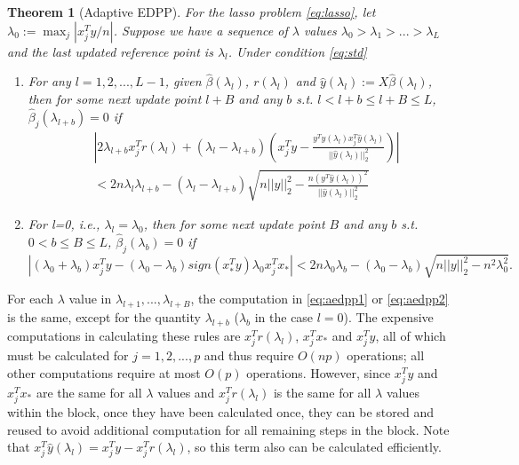 \documentclass[]{interact}
\theoremstyle{plain}%
\newtheorem{theorem}{Theorem}[section]
\theoremstyle{definition}
\theoremstyle{remark}
\begin{document}
\begin{theorem}[Adaptive EDPP]
    For the lasso problem \eqref{eq:lasso}, let $\lambda_0:=\max_j|x_j^Ty/n|$. Suppose we have a sequence of $\lambda$ values $\lambda_0>\lambda_1>...>\lambda_L$ and the last updated reference point is $\lambda_l$. Under condition \eqref{eq:std}
    \begin{enumerate}
        \item For any $l=1,2,...,L-1$, given $\hat{\beta}(\lambda_l)$, $r(\lambda_l)$ and $\hat{y}(\lambda_l):=X\hat{\beta}(\lambda_l)$, then for some next update point $l+B$ and any $b$ s.t. $l<l+b\leq l+B\leq L$, $\hat{\beta}_j(\lambda_{l+b})=0$ if
        \begin{equation}
            \label{eq:aedpp1}
            \begin{split}
                &\left|2\lambda_{l+b}x_j^Tr(\lambda_l)+(\lambda_l-\lambda_{l+b})\left( x_j^Ty-\frac{y^T\hat{y}(\lambda_l)x_j^T\hat{y}(\lambda_l)}{||\hat{y}(\lambda_l)||_2^2}\right)\right|\\&<2n\lambda_l\lambda_{l+b}-(\lambda_l-\lambda_{l+b})\sqrt{n||y||_2^2-\frac{n(y^T\hat{y}(\lambda_l))^2}{||\hat{y}(\lambda_l)||_2^2}}
            \end{split}
        \end{equation}
        \item For l=0, i.e., $\lambda_l=\lambda_0$, then for some next update point $B$ and any $b$ s.t. $0<b\leq B\leq L$, $\hat{\beta}_j(\lambda_{b})=0$ if
        \begin{equation}
            \label{eq:aedpp2}
            |(\lambda_0+\lambda_b)x_j^Ty-(\lambda_0-\lambda_b)sign(x_*^Ty)\lambda_0x_j^Tx_*|<2n\lambda_0\lambda_b-(\lambda_0-\lambda_b)\sqrt{n||y||_2^2-n^2\lambda_0^2}.
        \end{equation}
    \end{enumerate}
\end{theorem}

For each $\lambda$ value in $\lambda_{l+1},...,\lambda_{l+B}$, the computation in \eqref{eq:aedpp1} or \eqref{eq:aedpp2} is the same, except for the quantity $\lambda_{l+b}$ ($\lambda_b$ in the case $l=0$). The expensive computations in calculating these rules are $x_j^Tr(\lambda_l)$, $x_j^Tx_*$ and $x_j^Ty$, all of which must be calculated for $j=1,2,...,p$ and thus require $O(np)$ operations; all other computations require at most $O(p)$ operations. However, since $x_j^Ty$ and $x_j^Tx_*$ are the same for all $\lambda$ values and $x_j^Tr(\lambda_l)$ is the same for all $\lambda$ values within the block, once they have been calculated once, they can be stored and reused to avoid additional computation for all remaining steps in the block.  Note that $x_j^T\hat{y}(\lambda_l)=x_j^Ty-x_j^Tr(\lambda_l)$, so this term also can be calculated efficiently.
\end{document}
